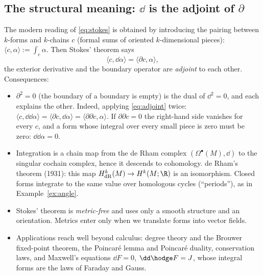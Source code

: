 \subsection{The structural meaning: $\dd$ is the adjoint of $\partial$}\label{sec:adjoint}

The modern reading of \eqref{eq:stokes} is obtained by introducing the pairing between $k$-forms and $k$-chains $c$ (formal sums of oriented $k$-dimensional pieces): $\langle c,\alpha\rangle:=\int_c\alpha$. Then Stokes' theorem says
\begin{equation}\label{eq:adjoint}
\langle c,\dd\alpha\rangle=\langle\partial c,\alpha\rangle,
\end{equation}
\ie the exterior derivative and the boundary operator are \emph{adjoint} to each other. Consequences:
\begin{itemize}
\item $\partial^2=0$ (the boundary of a boundary is empty) is the dual of $\dd^2=0$, and each explains the other. Indeed, applying \eqref{eq:adjoint} twice: $\langle c,\dd\dd\alpha\rangle=\langle\partial c,\dd\alpha\rangle=\langle\partial\partial c,\alpha\rangle$. If $\partial\partial c=0$ the right-hand side vanishes for every $c$, and a form whose integral over every small piece is zero must be zero: $\dd\dd\alpha=0$.
\item Integration is a chain map from the de Rham complex $(\Omega^\bullet(M),\dd)$ to the singular cochain complex, hence it descends to cohomology. de Rham's theorem (1931): this map $H^k_{\mathrm{dR}}(M)\to H^k(M;\R)$ is an isomorphism. Closed forms integrate to the same value over homologous cycles (``periods''), as in Example~\ref{ex:angle}.
\item Stokes' theorem is \emph{metric-free} and uses only a smooth structure and an orientation. Metrics enter only when we translate forms into vector fields.
\item Applications reach well beyond calculus: degree theory and the Brouwer fixed-point theorem, the Poincar\'e lemma and Poincar\'e duality, conservation laws, and Maxwell's equations $\dd F=0$, $\dd\hodge F=J$, whose integral forms are the laws of Faraday and Gauss.
\end{itemize}
